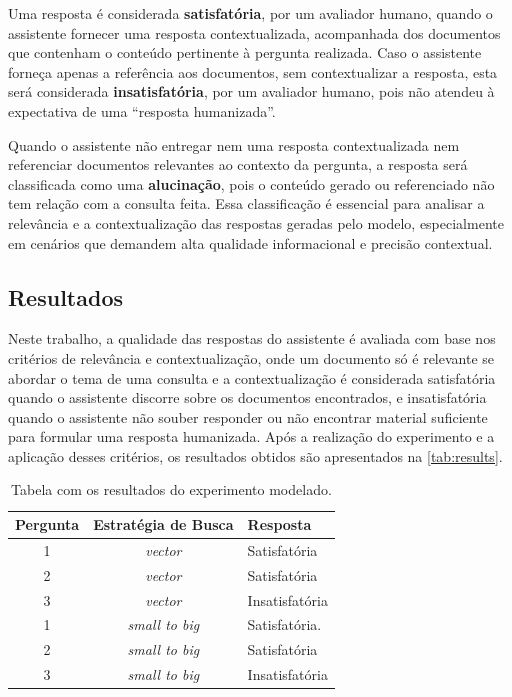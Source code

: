 \documentclass[a4paper, 12pt]{article}
\begin{document}
    Uma resposta é considerada \textbf{satisfatória}, por um avaliador humano, quando o assistente fornecer uma resposta contextualizada, acompanhada dos documentos que contenham o conteúdo pertinente à pergunta realizada. Caso o assistente forneça apenas a referência aos documentos, sem contextualizar a resposta, esta será considerada \textbf{insatisfatória}, por um avaliador humano, pois não atendeu à expectativa de uma ``resposta humanizada''.

    Quando o assistente não entregar nem uma resposta contextualizada nem referenciar documentos relevantes ao contexto da pergunta, a resposta será classificada como uma \textbf{alucinação}, pois o conteúdo gerado ou referenciado não tem relação com a consulta feita. Essa classificação é essencial para analisar a relevância e a contextualização das respostas geradas pelo modelo, especialmente em cenários que demandem alta qualidade informacional e precisão contextual.
    
    \subsection{Resultados} \label{sec:results}

    Neste trabalho, a qualidade das respostas do assistente é avaliada com base nos critérios de relevância e contextualização, onde um documento só é relevante se abordar o tema de uma consulta e a contextualização é considerada satisfatória quando o assistente discorre sobre os documentos encontrados, e insatisfatória quando o assistente não souber responder ou não encontrar material suficiente para formular uma resposta humanizada. Após a realização do experimento e a aplicação desses critérios, os resultados obtidos são apresentados na \autoref{tab:results}.
    
    \begin{center}
        \begin{table}[h!]
        \centering
        \renewcommand{\arraystretch}{1.5} %
        \setlength{\tabcolsep}{8pt} %
        \begin{tabular}{|c|c|l|}
        \hline
        \textbf{Pergunta} & \textbf{Estratégia de Busca} & \textbf{Resposta} \\ \hline
         1                & \textit{vector}        & Satisfatória   \\ \hline
         2                & \textit{vector}        & Satisfatória   \\ \hline
         3                & \textit{vector}        & Insatisfatória \\ \hline
         1                & \textit{small to big}  & Satisfatória.  \\ \hline
         2                & \textit{small to big}  & Satisfatória   \\ \hline
         3                & \textit{small to big}  & Insatisfatória \\ \hline
        \end{tabular}
        \caption{Tabela com os resultados do experimento modelado.}
        \label{tab:results}
        \end{table}
    \end{center}
\end{document}
